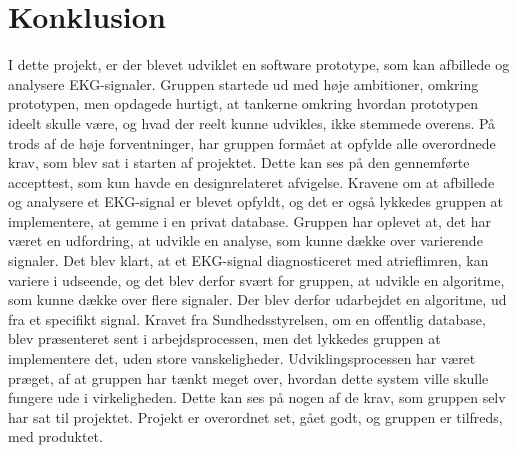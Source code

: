 \chapter{Konklusion}
I dette projekt, er der blevet udviklet en software prototype, som kan afbillede og analysere EKG-signaler. 
Gruppen startede ud med høje ambitioner, omkring prototypen, men opdagede hurtigt, at tankerne omkring hvordan prototypen ideelt skulle være, og hvad der reelt kunne udvikles, ikke stemmede overens. 
På trods af de høje forventninger, har gruppen formået at opfylde alle overordnede krav, som blev sat i starten af projektet. Dette kan ses på den gennemførte accepttest, som kun havde en designrelateret afvigelse. Kravene om at afbillede og analysere et EKG-signal er blevet opfyldt, og det er også lykkedes gruppen at implementere, at gemme i en privat database. 
Gruppen har oplevet at, det har været en udfordring, at udvikle en analyse, som kunne dække over varierende signaler. Det blev klart, at et EKG-signal diagnosticeret med atrieflimren, kan variere i udseende, og det blev derfor svært for gruppen, at udvikle en algoritme, som kunne dække over flere signaler. Der blev derfor udarbejdet en algoritme, ud fra et specifikt signal. 
Kravet fra Sundhedsstyrelsen, om en offentlig database, blev præsenteret sent i arbejdsprocessen, men det lykkedes gruppen at implementere det, uden store vanskeligheder. 
Udviklingsprocessen har været præget, af at gruppen har tænkt meget over, hvordan dette system ville skulle fungere ude i virkeligheden. Dette kan ses på nogen af de krav, som gruppen selv har sat til projektet. 
Projekt er overordnet set, gået godt, og gruppen er tilfreds, med produktet. 
